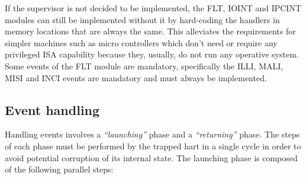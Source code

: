         If the supervisor is not decided to be implemented, the FLT, IOINT and IPCINT modules can still be implemented without it by hard-coding the handlers in memory locations that are always the same. This alleviates the requirements for simpler machines such as micro controllers which don't need or require any privileged ISA capability because they, usually, do not run any operative system. Some events of the FLT module are mandatory, specifically the ILLI, MALI, MISI and INCI events are mandatory and must always be implemented.

    \subsection{Event handling}

        \vspace{10pt}

        Handling events involves a \textit{``launching''} phase and a \textit{``returning''} phase. The steps of each phase must be performed by the trapped hart in a single cycle in order to avoid potential corruption of its internal state. The launching phase is composed of the following parallel steps:

